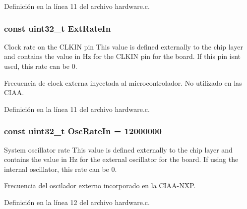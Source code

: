 Definición en la línea 11 del archivo hardware.\+c.

\subsubsection[{\texorpdfstring{Ext\+Rate\+In}{ExtRateIn}}]{\setlength{\rightskip}{0pt plus 5cm}const uint32\+\_\+t Ext\+Rate\+In}\hypertarget{group__hardware_ga74ceed751e84a920be263a7fe3da67f0}{}\label{group__hardware_ga74ceed751e84a920be263a7fe3da67f0}


Clock rate on the C\+L\+K\+IN pin This value is defined externally to the chip layer and contains the value in Hz for the C\+L\+K\+IN pin for the board. If this pin isn\textquotesingle{}t used, this rate can be 0. 

Frecuencia de clock externa inyectada al microcontrolador. No utilizado en las C\+I\+AA. 

Definición en la línea 11 del archivo hardware.\+c.

\subsubsection[{\texorpdfstring{Osc\+Rate\+In}{OscRateIn}}]{\setlength{\rightskip}{0pt plus 5cm}const uint32\+\_\+t Osc\+Rate\+In = 12000000}\hypertarget{group__hardware_ga2e84f0502f9a7fdd271b97c588696e6f}{}\label{group__hardware_ga2e84f0502f9a7fdd271b97c588696e6f}


System oscillator rate This value is defined externally to the chip layer and contains the value in Hz for the external oscillator for the board. If using the internal oscillator, this rate can be 0. 

Frecuencia del oscilador externo incorporado en la C\+I\+A\+A-\/\+N\+XP. 

Definición en la línea 12 del archivo hardware.\+c.

